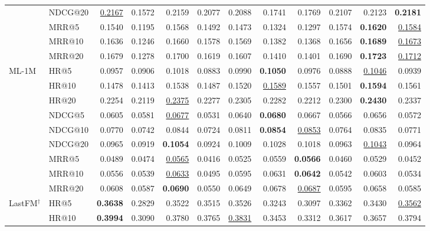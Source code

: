 \documentclass[sigconf,review,anonymous]{acmart}
\newcommand{\tblbest}[1]{\textbf{#1}}
\newcommand{\tblsecond}[1]{\underline{#1}}
\begin{document}
\begin{table}[t]
{\begin{tabular}{llrrrrrrrrrr}
      & NDCG@20 & \tblsecond{0.2167} & 0.1572 & 0.2159 & 0.2077 & 0.2088 & 0.1741 & 0.1769 & 0.2107 & 0.2123 & \tblbest{0.2181} \\
      & MRR@5   & 0.1540 & 0.1195 & 0.1568 & 0.1492 & 0.1473 & 0.1324 & 0.1297 & 0.1574 & \tblbest{0.1620} & \tblsecond{0.1584} \\
      & MRR@10  & 0.1636 & 0.1246 & 0.1660 & 0.1578 & 0.1569 & 0.1382 & 0.1368 & 0.1656 & \tblbest{0.1689} & \tblsecond{0.1673} \\
      & MRR@20  & 0.1679 & 0.1278 & 0.1700 & 0.1619 & 0.1607 & 0.1410 & 0.1401 & 0.1690 & \tblbest{0.1723} & \tblsecond{0.1712} \\
    \midrule
    \multirow{9}{*}{ML-1M}
      & HR@5    & 0.0957 & 0.0906 & 0.1018 & 0.0883 & 0.0990 & \tblbest{0.1050} & 0.0976 & 0.0888 & \tblsecond{0.1046} & 0.0939 \\
      & HR@10   & 0.1478 & 0.1413 & 0.1538 & 0.1487 & 0.1520 & \tblsecond{0.1589} & 0.1557 & 0.1501 & \tblbest{0.1594} & 0.1561 \\
      & HR@20   & 0.2254 & 0.2119 & \tblsecond{0.2375} & 0.2277 & 0.2305 & 0.2282 & 0.2212 & 0.2300 & \tblbest{0.2430} & 0.2337 \\
      & NDCG@5  & 0.0605 & 0.0581 & \tblsecond{0.0677} & 0.0531 & 0.0640 & \tblbest{0.0680} & 0.0667 & 0.0566 & 0.0656 & 0.0572 \\
      & NDCG@10 & 0.0770 & 0.0742 & 0.0844 & 0.0724 & 0.0811 & \tblbest{0.0854} & \tblsecond{0.0853} & 0.0764 & 0.0835 & 0.0771 \\
      & NDCG@20 & 0.0965 & 0.0919 & \tblbest{0.1054} & 0.0924 & 0.1009 & 0.1028 & 0.1018 & 0.0963 & \tblsecond{0.1043} & 0.0964 \\
      & MRR@5   & 0.0489 & 0.0474 & \tblsecond{0.0565} & 0.0416 & 0.0525 & 0.0559 & \tblbest{0.0566} & 0.0460 & 0.0529 & 0.0452 \\
      & MRR@10  & 0.0556 & 0.0539 & \tblsecond{0.0633} & 0.0495 & 0.0595 & 0.0631 & \tblbest{0.0642} & 0.0542 & 0.0603 & 0.0534 \\
      & MRR@20  & 0.0608 & 0.0587 & \tblbest{0.0690} & 0.0550 & 0.0649 & 0.0678 & \tblsecond{0.0687} & 0.0595 & 0.0658 & 0.0585 \\
    \midrule
    \multirow{9}{*}{LastFM$^\dagger$}
      & HR@5    & \tblbest{0.3638} & 0.2829 & 0.3522 & 0.3515 & 0.3526 & 0.3243 & 0.3097 & 0.3362 & 0.3430 & \tblsecond{0.3562} \\
      & HR@10   & \tblbest{0.3994} & 0.3090 & 0.3780 & 0.3765 & \tblsecond{0.3831} & 0.3453 & 0.3312 & 0.3617 & 0.3657 & 0.3794 \\

\end{tabular}}
\end{table}
\end{document}
